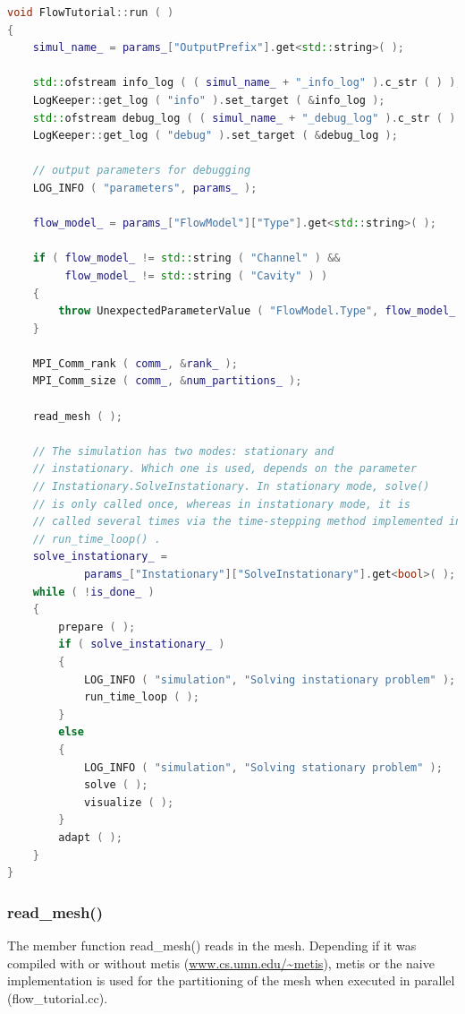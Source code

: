 \documentclass[a4paper, 11pt, twoside]{article}
\begin{document}
\begin{lstlisting}[language=C++, basicstyle={\footnotesize, \ttfamily}, keywordstyle=\color{blue},  numbers=none, tabsize=4]
void FlowTutorial::run ( )
{
    simul_name_ = params_["OutputPrefix"].get<std::string>( );

    std::ofstream info_log ( ( simul_name_ + "_info_log" ).c_str ( ) );
    LogKeeper::get_log ( "info" ).set_target ( &info_log );
    std::ofstream debug_log ( ( simul_name_ + "_debug_log" ).c_str ( ) );
    LogKeeper::get_log ( "debug" ).set_target ( &debug_log );

    // output parameters for debugging
    LOG_INFO ( "parameters", params_ );

    flow_model_ = params_["FlowModel"]["Type"].get<std::string>( );

    if ( flow_model_ != std::string ( "Channel" ) &&
         flow_model_ != std::string ( "Cavity" ) )
    {
        throw UnexpectedParameterValue ( "FlowModel.Type", flow_model_ );
    }

    MPI_Comm_rank ( comm_, &rank_ );
    MPI_Comm_size ( comm_, &num_partitions_ );

    read_mesh ( );

    // The simulation has two modes: stationary and
    // instationary. Which one is used, depends on the parameter
    // Instationary.SolveInstationary. In stationary mode, solve()
    // is only called once, whereas in instationary mode, it is
    // called several times via the time-stepping method implemented in
    // run_time_loop() .
    solve_instationary_ =
            params_["Instationary"]["SolveInstationary"].get<bool>( );
    while ( !is_done_ )
    {
        prepare ( );
        if ( solve_instationary_ )
        {
            LOG_INFO ( "simulation", "Solving instationary problem" );
            run_time_loop ( );
        }
        else
        {
            LOG_INFO ( "simulation", "Solving stationary problem" );
            solve ( );
            visualize ( );
        }
        adapt ( );
    }
}
\end{lstlisting}

\subsubsection{read\_mesh()}\label{read-mesh}
The member function read\_mesh() reads in the mesh. Depending if it was compiled with or without metis (\url{www.cs.umn.edu/~metis}), metis or the naive implementation is used for the partitioning of the mesh when executed in parallel  (flow\_tutorial.cc).
\end{document}

